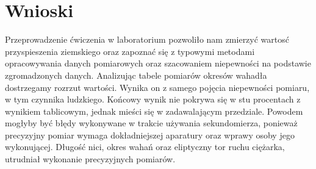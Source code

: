 \documentclass[a4paper,12pts]{article}
\begin{document}

	\section{Wnioski}
	Przeprowadzenie ćwiczenia w laboratorium pozwoliło nam zmierzyć wartosć przyspieszenia ziemskiego oraz zapoznać się z typowymi metodami opracowywania danych pomiarowych oraz szacowaniem niepewności na podstawie zgromadzonych danych. 
	Analizując tabele pomiarów okresów wahadła dostrzegamy rozrzut wartości. Wynika on z samego pojęcia niepewności pomiaru, w tym czynnika ludzkiego. Końcowy wynik nie pokrywa się w stu procentach z wynikiem tablicowym, jednak mieści się w zadawalającym przedziale. Powodem mogłyby być błędy wykonywane w trakcie używania sekundomierza, ponieważ precyzyjny pomiar wymaga dokładniejszej aparatury oraz wprawy osoby jego wykonującej. Długość nici, okres wahań oraz eliptyczny tor ruchu ciężarka, utrudniał wykonanie precyzyjnych pomiarów.
		
\end{document}
